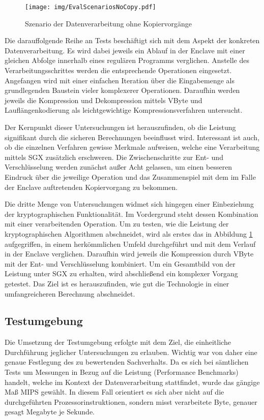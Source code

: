 \begin{figure}[h]
	\texttt{[image: img/EvalScenariosNoCopy.pdf]}
	\centering
	\caption{Szenario der Datenverarbeitung ohne Kopiervorgänge}
	\label{fig:scenarionocopy}
\end{figure}

Die darauffolgende Reihe an Tests beschäftigt sich mit dem Aspekt der konkreten Datenverarbeitung. Es wird dabei jeweils ein Ablauf in der Enclave mit einer gleichen Abfolge innerhalb eines regulären Programms verglichen. Anstelle des Verarbeitungsschrittes werden die entsprechende Operationen eingesetzt. Angefangen wird mit einer einfachen Iteration über die Eingabemenge als grundlegenden Baustein vieler komplexerer Operationen. Daraufhin werden jeweils die Kompression und Dekompression mittels VByte und Lauflängenkodierung als leichtgewichtige Kompressionsverfahren untersucht.

Der Kernpunkt dieser Untersuchungen ist herauszufinden, ob die Leistung signifikant durch die sicheren Berechnungen beeinflusst wird. Interessant ist auch, ob die einzelnen Verfahren gewisse Merkmale aufweisen, welche eine Verarbeitung mittels \ac{SGX} zusätzlich erschweren. Die Zwischenschritte zur Ent- und Verschlüsselung werden zunächst außer Acht gelassen, um einen besseren Eindruck über die jeweilige Operation und das Zusammenspiel mit dem im Falle der Enclave auftretenden Kopiervorgang zu bekommen.

Die dritte Menge von Untersuchungen widmet sich hingegen einer Einbeziehung der kryptographischen Funktionalität. Im Vordergrund steht dessen Kombination mit einer verarbeitenden Operation. Um zu testen, wie die Leistung der kryptographischen Algorithmen abschneidet, wird als erstes das in Abbildung \ref{fig:scenarionocopy} aufgegriffen, in einem herkömmlichen Umfeld durchgeführt und mit dem Verlauf in der Enclave verglichen. Daraufhin wird jeweils die Kompression durch VByte mit der Ent- und Verschlüsselung kombiniert. Um ein Gesamtbild von der Leistung unter \ac{SGX} zu erhalten, wird abschließend ein komplexer Vorgang getestet. Das Ziel ist es herauszufinden, wie gut die Technologie in einer umfangreicheren Berechnung abschneidet.
\subsection{Testumgebung}
Die Umsetzung der Testumgebung erfolgte mit dem Ziel, die einheitliche Durchführung jeglicher Untersuchungen zu erlauben. Wichtig war von daher eine genaue Festlegung des zu bewertenden Sachverhalts. Da es sich bei sämtlichen Tests um Messungen in Bezug auf die Leistung (Performance Benchmarks) handelt, welche im Kontext der Datenverarbeitung stattfindet, wurde das gängige Maß \ac{MIPS} gewählt. In diesem Fall orientiert es sich aber nicht auf die durchgeführten Prozessorinstruktionen, sondern misst verarbeitete Byte, genauer gesagt Megabyte je Sekunde. 

